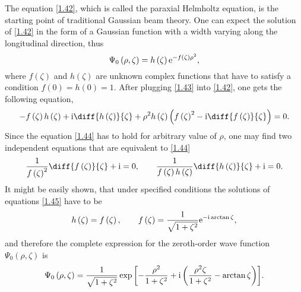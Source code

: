 The equation \ref{1.42}, which is called the paraxial Helmholtz equation, is the starting point of traditional Gaussian beam theory. One can expect the solution of \ref{1.42} in the form of a Gaussian function with a width varying along the longitudinal direction, thus 
\begin{equation}
\label{1.43}
\Psi_0 \left(\rho, \zeta \right) = h\left(\zeta \right)\mathrm{e}^{-f\left(\zeta \right) \rho^2},
\end{equation}
where $ f\left(\zeta \right) $ and $ h\left(\zeta \right) $ are unknown complex functions that have to satisfy a condition $ f\left(0 \right) = h\left(0 \right) = 1 $. After plugging \ref{1.43} into \ref{1.42}, one gets the following equation,
\begin{equation}
\label{1.44}
-f\left(\zeta \right) h\left(\zeta \right) + \i \diff{h\left(\zeta \right)}{\zeta} + \rho^2 h\left(\zeta \right) \left(f\left(\zeta \right)^2 - \i \diff{f\left(\zeta \right)}{\zeta} \right) = 0.
\end{equation}
Since the equation \ref{1.44} has to hold for arbitrary value of $ \rho $, one may find two independent equations that are equivalent to \ref{1.44}
\begin{equation}
\label{1.45}
\frac{1}{f\left(\zeta \right)^2} \diff{f\left(\zeta \right)}{\zeta} + \i = 0, \qquad \frac{1}{f\left(\zeta \right) h\left(\zeta \right)} \diff{h\left(\zeta \right)}{\zeta} + \i = 0.
\end{equation}
It might be easily shown, that under specified conditions the solutions of equations \ref{1.45} have to be
\begin{equation}
\label{1.46}
h\left(\zeta \right) = f\left(\zeta \right), \qquad f\left(\zeta \right) = \frac{1}{\sqrt{1 + \zeta^2}} \mathrm{e}^{-\mathrm{i} \arctan{\zeta}},
\end{equation}
and therefore the complete expression for the zeroth-order wave function $ \Psi_0 \left(\rho, \zeta \right) $ is
\begin{equation}
\label{1.47}
\Psi_0 \left(\rho, \zeta \right) = \frac{1}{\sqrt{1 + \zeta^2}} \exp{\left[- \frac{\rho^2}{1 + \zeta^2} + \mathrm{i}\left(\frac{\rho^2 \zeta}{1 + \zeta^2} - \arctan{\zeta} \right) \right]}.
\end{equation}

